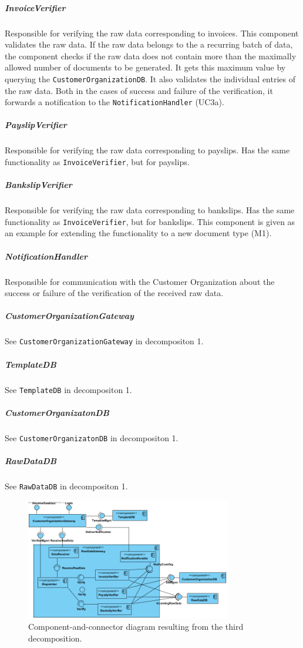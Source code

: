\documentclass[a4paper,10pt]{article}
\begin{document}
\subparagraph{InvoiceVerifier} Responsible for verifying the raw data corresponding to invoices. This component validates the raw data. If the raw data belongs to the a recurring batch of data, the component checks if the raw data does not contain more than the maximally allowed number of documents to be generated. It gets this maximum value by querying the \texttt{CustomerOrganizationDB}. It also validates the individual entries of the raw data. Both in the cases of success and failure of the verification, it forwards a notification to the \texttt{NotificationHandler} (UC3a).

\subparagraph{PayslipVerifier} Responsible for verifying the raw data corresponding to payslips. Has the same functionality as \texttt{InvoiceVerifier}, but for payslips.

\subparagraph{BankslipVerifier} Responsible for verifying the raw data corresponding to bankslips. Has the same functionality as \texttt{InvoiceVerifier}, but for bankslips. This component is given as an example for extending the functionality to a new document type (M1).

\subparagraph{NotificationHandler} Responsible for communication with the Customer Organization about the success or failure of the verification of the received raw data.

\subparagraph{CustomerOrganizationGateway} See \texttt{CustomerOrganizationGateway} in decompositon 1.

\subparagraph{TemplateDB} See \texttt{TemplateDB} in decompositon 1.
\subparagraph{CustomerOrganizatonDB} See \texttt{CustomerOrganizatonDB} in decompositon 1.
\subparagraph{RawDataDB} See \texttt{RawDataDB} in decompositon 1.

\begin{figure}[!htp]
	\centering
	\includegraphics[width=0.8\textwidth]{RawDataGateway.png}
	\caption{Component-and-connector diagram resulting from the third decomposition.
	}\label{fig:compandcondecomp3}
\end{figure}
\end{document}
